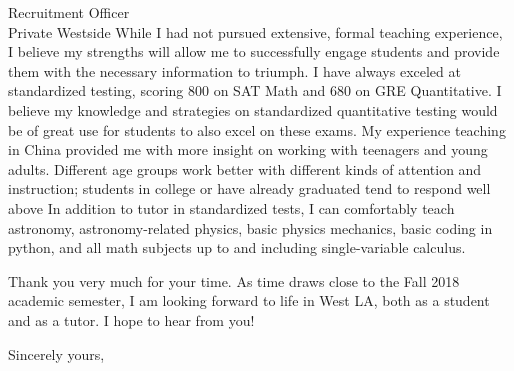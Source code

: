 \documentclass[11pt]{letter} %
\begin{document}
\begin{letter}{Recruitment Officer \\
  Private Westside}
While I had not pursued extensive, formal teaching experience, I believe my strengths will allow me to successfully engage students and provide them with the necessary information to triumph. I have always exceled at standardized testing, scoring 800 on SAT Math and 680 on GRE Quantitative. I believe my knowledge and strategies on standardized quantitative testing would be of great use for students to also excel on these exams. My experience teaching in China provided me with more insight on working with teenagers and young adults. Different age groups work better with different kinds of attention and instruction; students in college or have already graduated tend to respond well above In addition to tutor in standardized tests, I can comfortably teach astronomy, astronomy-related physics, basic physics mechanics, basic coding in python, and all math subjects up to and including single-variable calculus.

Thank you very much for your time. As time draws close to the Fall 2018 academic semester, I am looking forward to life in West LA, both as a student and as a tutor. I hope to hear from you!

\closing{Sincerely yours,} 


\end{letter}
\end{document}
